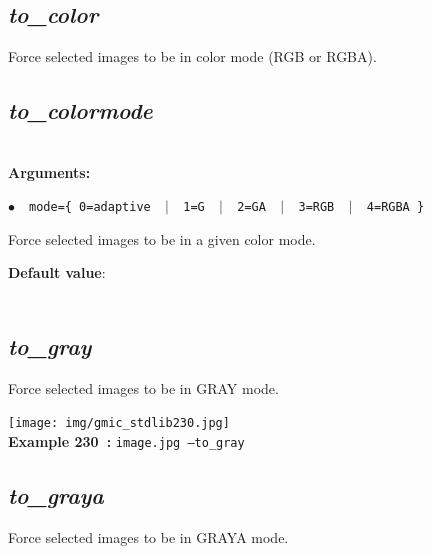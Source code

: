 \documentclass[a4paper,10.5pt,twoside]{book}
\newcommand{\Cb}[1]{\textcolor{cb}{#1}}
\newcommand{\Cc}[1]{\textcolor{cc}{#1}}
\begin{document}
\subsection{\emph{to\_color} }\vspace*{-0.7em}
Force selected images to be in color mode (RGB or RGBA).


\subsection{\emph{to\_colormode} }\vspace*{-0.7em}
~\\\textbf{\Cb{Arguments: }}\begin{flushleft}
{\small \Cb{\hspace*{0.5cm}$\bullet$~~\texttt{mode=\{ 0=adaptive ~$|$~ 1=G ~$|$~ 2=GA ~$|$~ 3=RGB ~$|$~ 4=RGBA \}}}}\end{flushleft}
Force selected images to be in a given color mode.
\begin{flushleft}\Cc{\textbf{Default value}:\\~\\\hspace*{0.5cm}{\small $\bullet$~~\texttt{'mode=0'.}}}\end{flushleft}


\subsection{\emph{to\_gray} }\vspace*{-0.7em}
Force selected images to be in GRAY mode.
\begin{center}\texttt{[image: img/gmic\_stdlib230.jpg]}\\
{\footnotesize \textbf{Example 230~:} \texttt{image.jpg --to\_gray}}
\end{center}

\subsection{\emph{to\_graya} }\vspace*{-0.7em}
Force selected images to be in GRAYA mode.
\end{document}
